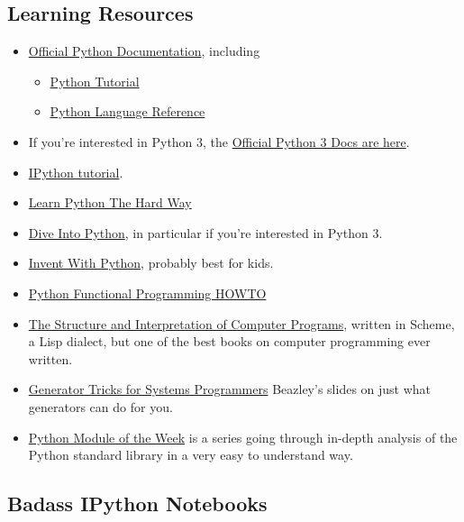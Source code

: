 \documentclass[11pt]{article}
\providecommand{\tightlist}{%
      \setlength{\itemsep}{0pt}\setlength{\parskip}{0pt}}
\begin{document}
\subsection{Learning Resources}\label{learning-resources}

\begin{itemize}
\tightlist
\item
  \href{http://docs.python.org/2.7}{Official Python Documentation},
  including

  \begin{itemize}
  \tightlist
  \item
    \href{http://docs.python.org/2.7/tutorial}{Python Tutorial}
  \item
    \href{http://docs.python.org/2.7/reference}{Python Language
    Reference}
  \end{itemize}
\item
  If you're interested in Python 3, the
  \href{http://docs.python.org/3/}{Official Python 3 Docs are here}.
\item
  \href{http://ipython.org/ipython-doc/dev/interactive/tutorial.html}{IPython
  tutorial}.
\item
  \href{http://learnpythonthehardway.org/book/}{Learn Python The Hard
  Way}
\item
  \href{http://www.diveintopython.net/}{Dive Into Python}, in particular
  if you're interested in Python 3.
\item
  \href{http://inventwithpython.com/}{Invent With Python}, probably best
  for kids.
\item
  \href{http://docs.python.org/2/howto/functional.html}{Python
  Functional Programming HOWTO}
\item
  \href{http://mitpress.mit.edu/sicp/full-text/book/book.html}{The
  Structure and Interpretation of Computer Programs}, written in Scheme,
  a Lisp dialect, but one of the best books on computer programming ever
  written.
\item
  \href{http://www.dabeaz.com/generators/}{Generator Tricks for Systems
  Programmers} Beazley's slides on just what generators can do for you.
\item
  \href{http://pymotw.com/2/contents.html}{Python Module of the Week} is
  a series going through in-depth analysis of the Python standard
  library in a very easy to understand way.
\end{itemize}

\subsection{Badass IPython Notebooks}\label{badass-ipython-notebooks}
\end{document}
